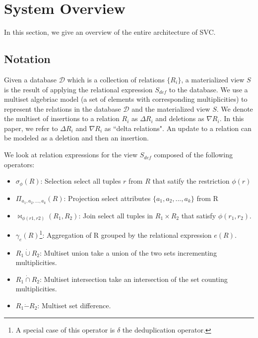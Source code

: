 \section{System Overview}\label{sec-arch}
In this section, we give an overview of the entire architecture of SVC.
\vspace{-.5em}
\subsection{Notation}
Given a database $\mathcal{D}$ which is a collection of relations $\{R_i\}$, a materialized view $S$ is the result of applying the relational expression $S_{def}$ to the database.
We use a multiset algebriac model (a set of elements with corresponding multiplicities) to represent the relations in the database $\mathcal{D}$ and the materialized view $S$.
We denote the multiset of insertions to a relation $R_i$ as $\Delta R_i$ and deletions as $\nabla R_i$.
In this paper, we refer to $\Delta R_i$ and $\nabla R_i$ as ``delta relations".
An update to a relation can be modeled as a deletion and then an insertion.

We look at relation expressions for the view $S_{def}$ composed of the following operators:
\begin{itemize}\vspace{-.45em}
\item $\sigma_{\phi}(R)$: Selection select all tuples $r$ from $R$ that satify the restriction $\phi (r)$ \vspace{-.45em}
\item $\Pi_{a_1,a_2,...,a_k}(R)$: Projection select attributes $\{a_1,a_2,...,a_k\}$ from R \vspace{-.45em}
\item $\bowtie_{\phi (r1,r2)}(R_1,R_2)$: Join select all tuples in $R_1 \times R_2$ that satisfy $\phi (r_1,r_2)$.
\item $\gamma_{e}(R)$\footnote{A special case of this operator is $\delta$ the deduplication operator.}: Aggregation of R grouped by the relational expression $e(R)$.\vspace{-.45em}
\item $R_1 \dot{\cup} R_2$: Multiset union take a union of the two sets incrementing multiplicities.
\item $R_1 \dot{\cap} R_2$: Multiset intersection take an intersection of the set counting multiplicities.
\item $R_1 \dot{-} R_2$: Multiset set difference.
\end{itemize}

